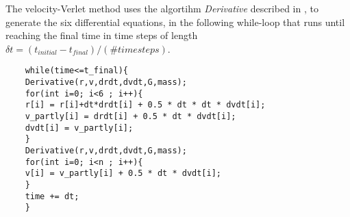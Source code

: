 The velocity-Verlet method uses the algortihm \textit{Derivative} described in , to generate the six differential equations, in the following while-loop that runs until reaching the final time in time steps of length $\delta t = (t_{initial} - t_{final})/(\# time steps)$.
\begin{lstlisting}
    while(time<=t_final){
    Derivative(r,v,drdt,dvdt,G,mass);
    for(int i=0; i<6 ; i++){
    r[i] = r[i]+dt*drdt[i] + 0.5 * dt * dt * dvdt[i];
    v_partly[i] = drdt[i] + 0.5 * dt * dvdt[i];
    dvdt[i] = v_partly[i];
    }
    Derivative(r,v,drdt,dvdt,G,mass);
    for(int i=0; i<n ; i++){
    v[i] = v_partly[i] + 0.5 * dt * dvdt[i];
    }
    time += dt;
    }
\end{lstlisting}